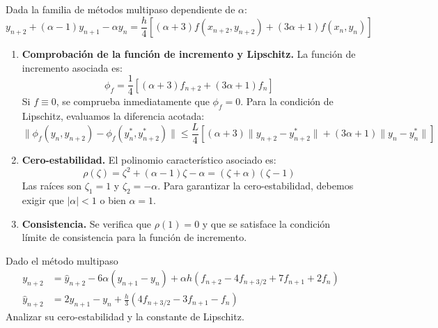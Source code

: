 \begin{ejer}
    [2.5.1] Dada la familia de métodos multipaso dependiente de $\alpha$:
$$
y_{n+2} + (\alpha - 1)y_{n+1} - \alpha y_n = \frac{h}{4} \left[ (\alpha + 3)f(x_{n+2}, y_{n+2}) + (3\alpha + 1)f(x_n, y_n) \right]
$$
\end{ejer}

\begin{enumerate}
    \item \textbf{Comprobación de la función de incremento y Lipschitz.}
    La función de incremento asociada es:
    $$
    \phi_f = \frac{1}{4} \left[ (\alpha + 3)f_{n+2} + (3\alpha + 1)f_n \right]
    $$
    Si $f \equiv 0$, se comprueba inmediatamente que $\phi_f = 0$. Para la condición de Lipschitz, evaluamos la diferencia acotada:
    $$
    \|\phi_f(y_n, y_{n+2}) - \phi_f(y_n^*, y_{n+2}^*)\| \le \frac{L}{4} \left[ (\alpha + 3)\|y_{n+2} - y_{n+2}^*\| + (3\alpha + 1)\|y_n - y_n^*\| \right]
    $$

    \item \textbf{Cero-estabilidad.}
    El polinomio característico asociado es:
    $$
    \rho(\zeta) = \zeta^2 + (\alpha - 1)\zeta - \alpha = (\zeta + \alpha)(\zeta - 1)
    $$
    Las raíces son $\zeta_1 = 1$ y $\zeta_2 = -\alpha$. Para garantizar la cero-estabilidad, debemos exigir que $|\alpha| < 1$ o bien $\alpha = 1$.

    \item \textbf{Consistencia.}
    Se verifica que $\rho(1) = 0$ y que se satisface la condición límite de consistencia para la función de incremento.
\end{enumerate}
\begin{ejer}[2.5.3]
Dado el método multipaso
$$
\begin{aligned}
    y_{n+2} &= \hat{y}_{n+2} - 6\alpha(y_{n+1} - y_n) + \alpha h(f_{n+2} - 4f_{n+3/2} + 7f_{n+1} + 2f_n) \\
    \hat{y}_{n+2} &= 2y_{n+1} - y_n + \frac{h}{3}(4f_{n+3/2} - 3f_{n+1} - f_n)
\end{aligned}
$$
Analizar su cero-estabilidad y la constante de Lipschitz.
\end{ejer}

